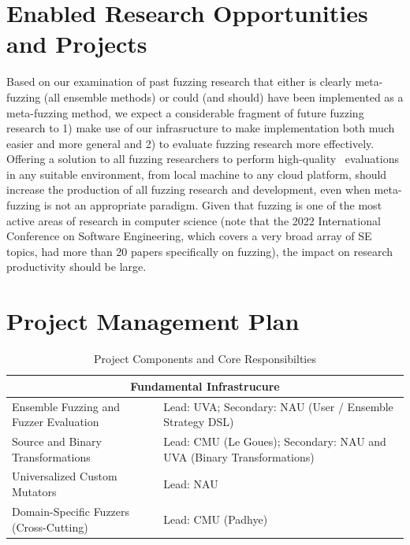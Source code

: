

\section{Enabled Research Opportunities and Projects}

Based on our examination of past fuzzing research that either is
clearly meta-fuzzing (all ensemble methods) or could (and should)
have been implemented as a meta-fuzzing method, we expect a
considerable fragment of future fuzzing research to 1) make
use of our infrasructure to make implementation both much easier and
more general and 2) to evaluate fuzzing research more effectively.
Offering a solution to all fuzzing researchers to perform
high-quality~\cite{HicksFuzzing} evaluations in any suitable
environment, from local machine to any cloud platform, should increase
the production of all fuzzing research and development, even when
meta-fuzzing is not an appropriate paradigm.  Given that fuzzing is
one of the most active areas of research in computer science (note
that the 2022 International Conference on Software Engineering, which
covers a very broad array of SE topics, had more than 20 papers
specifically on fuzzing), the impact on research productivity should
be large.

\section{Project Management Plan}

%
\label{sec:plan}


\begin{table}
 \begin{tabularx}{\textwidth}{|p{7.5cm}|X|}
   \hline
   \multicolumn{2}{|c|}{Fundamental Infrastrucure} \\
   \hline
    Ensemble Fuzzing and
    Fuzzer Evaluation & Lead: UVA; Secondary: NAU (User / Ensemble
    Strategy DSL)\\
   \hline
    Source and Binary Transformations & Lead: CMU (Le
    Goues); Secondary: NAU and UVA (Binary Transformations)\\
   \hline
    Universalized Custom Mutators & Lead: NAU\\
   \hline
     Domain-Specific Fuzzers (Cross-Cutting) & Lead: CMU (Padhye) \\
   \hline
  \end{tabularx}
  \caption{\label {tab:thrusts} Project Components and Core Responsibilties}
\end{table}

